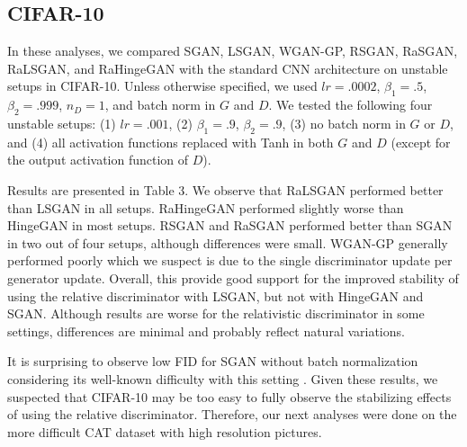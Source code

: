 \documentclass{article}
\begin{document}
\subsection{CIFAR-10}

In these analyses, we compared SGAN, LSGAN, WGAN-GP, RSGAN, RaSGAN, RaLSGAN, and RaHingeGAN with the standard CNN architecture on unstable setups in CIFAR-10. Unless otherwise specified, we used $lr=.0002$, $\beta_1=.5$, $\beta_2=.999$, $n_D=1$, and batch norm \citep{BatchNorm} in $G$ and $D$. We tested the following four unstable setups: (1) $lr = .001$, (2) $\beta_1=.9$, $\beta_2=.9$, (3) no batch norm in $G$ or $D$, and (4) all activation functions replaced with Tanh in both $G$ and $D$ (except for the output activation function of $D$).

Results are presented in Table 3. We observe that RaLSGAN performed better than LSGAN in all setups. RaHingeGAN performed slightly worse than HingeGAN in most setups. RSGAN and RaSGAN performed better than SGAN in two out of four setups, although differences were small. WGAN-GP generally performed poorly which we suspect is due to the single discriminator update per generator update. Overall, this provide good support for the improved stability of using the relative discriminator with LSGAN, but not with HingeGAN and SGAN. Although results are worse for the relativistic discriminator in some settings, differences are minimal and probably reflect natural variations. 

It is surprising to observe low FID for SGAN without batch normalization considering its well-known difficulty with this setting \citep{WGAN}. Given these results, we suspected that CIFAR-10 may be too easy to fully observe the stabilizing effects of using the relative discriminator. Therefore, our next analyses were done on the more difficult CAT dataset with high resolution pictures.
\end{document}
